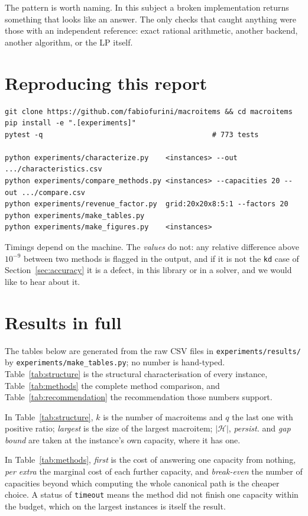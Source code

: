 \documentclass[11pt,a4paper]{article}
\newcommand{\code}[1]{\texttt{#1}}
\begin{document}
The pattern is worth naming. In this subject a broken implementation returns
something that looks like an answer. The only checks that caught anything were
those with an independent reference: exact rational arithmetic, another
backend, another algorithm, or the LP itself.

\section{Reproducing this report}

\begin{verbatim}
git clone https://github.com/fabiofurini/macroitems && cd macroitems
pip install -e ".[experiments]"
pytest -q                                        # 773 tests

python experiments/characterize.py    <instances> --out .../characteristics.csv
python experiments/compare_methods.py <instances> --capacities 20 --out .../compare.csv
python experiments/revenue_factor.py  grid:20x20x8:5:1 --factors 20
python experiments/make_tables.py
python experiments/make_figures.py    <instances>
\end{verbatim}

Timings depend on the machine. The \emph{values} do not: any relative
difference above $10^{-9}$ between two methods is flagged in the output, and
if it is not the \code{kd} case of Section~\ref{sec:accuracy} it is a defect,
in this library or in a solver, and we would like to hear about it.

\appendix
\section{Results in full}
\label{sec:full-results}

The tables below are generated from the raw CSV files in
\code{experiments/results/} by \code{experiments/make\_tables.py}; no number
is hand-typed. Table~\ref{tab:structure} is the structural characterisation of
every instance, Table~\ref{tab:methods} the complete method comparison, and
Table~\ref{tab:recommendation} the recommendation those numbers support.

In Table~\ref{tab:structure}, $k$ is the number of macroitems and $q$ the last
one with positive ratio; \emph{largest} is the size of the largest macroitem;
$|\mathcal H|$, \emph{persist.} and \emph{gap bound} are taken at the
instance's own capacity, where it has one.

In Table~\ref{tab:methods}, \emph{first} is the cost of answering one capacity
from nothing, \emph{per extra} the marginal cost of each further capacity, and
\emph{break-even} the number of capacities beyond which computing the whole
canonical path is the cheaper choice. A status of \code{timeout} means the
method did not finish one capacity within the budget, which on the largest
instances is itself the result.

{\footnotesize

}

{\footnotesize

}


\end{document}
